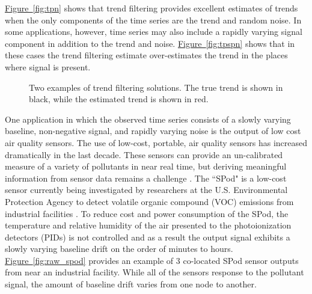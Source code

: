 \documentclass[12pt]{article}
\newcommand{\Fig}[1]{\hyperref[fig:#1]{Figure~\ref*{fig:#1}}} %
\newcommand{\Fig}[1]{{Figure~\ref{fig:#1}}} %
\begin{document}
	\Fig{tpn} shows that trend filtering provides excellent estimates of trends when the only components of the time series are the trend and random noise. In some applications, however, time series may also include a rapidly varying signal component in addition to the trend and noise. \Fig{tpspn} shows that in these cases the trend filtering estimate over-estimates the trend in the places where signal is present.
	   	
	\begin{figure}[t]
		\centering
		\caption{Two examples of trend filtering solutions. The true trend is shown in black, while the estimated trend is shown in red.}		
		\label{fig:trendfilter}
	\end{figure}
	 
	
	One application in which the observed time series consists of a slowly varying baseline, non-negative signal, and rapidly varying noise is the output of low cost air quality sensors. The use of low-cost, portable, air quality sensors has increased dramatically in the last decade. These sensors can provide an un-calibrated measure of a variety of pollutants in near real time, but deriving meaningful information from sensor data remains a challenge \citep{snyder2013changing}. The ``SPod" is a low-cost sensor currently being investigated by researchers at the U.S. Environmental Protection Agency to detect volatile organic compound (VOC) emissions from industrial facilities \citep{thoma2016south}. To reduce cost and power consumption of the SPod, the temperature and relative humidity of the air presented to the photoionization detectors (PIDs) is not controlled and as a result the output signal exhibits a slowly varying baseline drift on the order of minutes to hours. \Fig{raw_spod} provides an example of 3 co-located SPod sensor outputs from near an industrial facility. While all of the sensors response to the pollutant signal, the amount of baseline drift varies from one node to another.
	 
\end{document}
